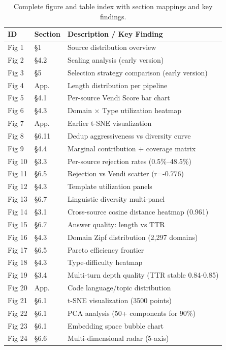 \begin{table}[t]
\centering
\caption{Complete figure and table index with section mappings and key findings.}
\label{tab:deliverables_index}
\scriptsize
\begin{tabular}{llp{7cm}}
\toprule
\textbf{ID} & \textbf{Section} & \textbf{Description / Key Finding} \\
\midrule
Fig 1 & §1 & Source distribution overview \\
Fig 2 & §4.2 & Scaling analysis (early version) \\
Fig 3 & §5 & Selection strategy comparison (early version) \\
Fig 4 & App. & Length distribution per pipeline \\
Fig 5 & §4.1 & Per-source Vendi Score bar chart \\
Fig 6 & §4.3 & Domain × Type utilization heatmap \\
Fig 7 & App. & Earlier t-SNE visualization \\
Fig 8 & §6.11 & Dedup aggressiveness vs diversity curve \\
Fig 9 & §4.4 & Marginal contribution + coverage matrix \\
Fig 10 & §3.3 & Per-source rejection rates (0.5\%–48.5\%) \\
Fig 11 & §6.5 & Rejection vs Vendi scatter (r=-0.776) \\
Fig 12 & §4.3 & Template utilization panels \\
Fig 13 & §6.7 & Linguistic diversity multi-panel \\
Fig 14 & §3.1 & Cross-source cosine distance heatmap (0.961) \\
Fig 15 & §6.7 & Answer quality: length vs TTR \\
Fig 16 & §4.3 & Domain Zipf distribution (2,297 domains) \\
Fig 17 & §6.5 & Pareto efficiency frontier \\
Fig 18 & §4.3 & Type-difficulty heatmap \\
Fig 19 & §3.4 & Multi-turn depth quality (TTR stable 0.84-0.85) \\
Fig 20 & App. & Code language/topic distribution \\
Fig 21 & §6.1 & t-SNE visualization (3500 points) \\
Fig 22 & §6.1 & PCA analysis (50+ components for 90\%) \\
Fig 23 & §6.1 & Embedding space bubble chart \\
Fig 24 & §6.6 & Multi-dimensional radar (5-axis) \\

\end{tabular}
\end{table}
